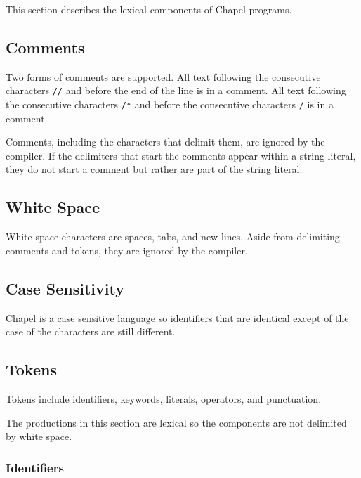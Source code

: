 \label{Lexical_Structure}

This section describes the lexical components of Chapel programs.

\subsection{Comments}
\label{Comments}

Two forms of comments are supported.  All text following the
consecutive characters {\tt //} and before the end of the line is in a
comment.  All text following the consecutive characters {\tt /*} and
before the consecutive characters {\tt */} is in a comment.

Comments, including the characters that delimit them, are ignored by
the compiler.  If the delimiters that start the comments appear within
a string literal, they do not start a comment but rather are part of
the string literal.

\subsection{White Space}
\label{White_Space}

White-space characters are spaces, tabs, and new-lines.  Aside from
delimiting comments and tokens, they are ignored by the compiler.

\subsection{Case Sensitivity}
\label{Case_Sensitivity}

Chapel is a case sensitive language so identifiers that are identical
except of the case of the characters are still different.

\subsection{Tokens}
\label{Tokens}

Tokens include identifiers, keywords, literals, operators, and
punctuation.

The productions in this section are lexical so the components are not
delimited by white space.

\subsubsection{Identifiers}
\label{Identifiers}

